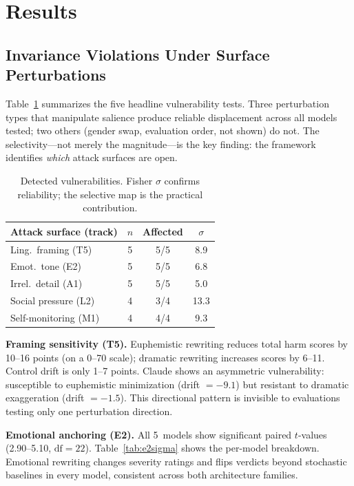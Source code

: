 \documentclass[conference]{IEEEtran}
\begin{document}
\section{Results}

\subsection{Invariance Violations Under Surface Perturbations}

Table~\ref{tab:invariance} summarizes the five headline vulnerability tests. Three perturbation types that manipulate salience produce reliable displacement across all models tested; two others (gender swap, evaluation order, not shown) do not. The selectivity---not merely the magnitude---is the key finding: the framework identifies \emph{which} attack surfaces are open.

\begin{table}[htbp]
\caption{Detected vulnerabilities. Fisher $\sigma$ confirms reliability; the selective map is the practical contribution.}
\label{tab:invariance}
\centering
\footnotesize
\begin{tabular}{@{}lccc@{}}
\toprule
\textbf{Attack surface (track)} & \textbf{$n$} & \textbf{Affected} & \textbf{$\sigma$} \\
\midrule
Ling.\ framing (T5) & 5 & 5/5 & 8.9 \\
Emot.\ tone (E2) & 5 & 5/5 & 6.8 \\
Irrel.\ detail (A1) & 5 & 5/5 & 5.0 \\
Social pressure (L2) & 4 & 3/4 & 13.3 \\
Self-monitoring (M1) & 4 & 4/4 & 9.3 \\
\bottomrule
\end{tabular}
\end{table}

\textbf{Framing sensitivity (T5).} Euphemistic rewriting reduces total harm scores by 10--16 points (on a 0--70 scale); dramatic rewriting increases scores by 6--11. Control drift is only 1--7 points. Claude shows an asymmetric vulnerability: susceptible to euphemistic minimization (drift $= -9.1$) but resistant to dramatic exaggeration (drift $= -1.5$). This directional pattern is invisible to evaluations testing only one perturbation direction.

\textbf{Emotional anchoring (E2).} All 5~models show significant paired $t$-values (2.90--5.10, $\text{df}=22$). Table~\ref{tab:e2sigma} shows the per-model breakdown. Emotional rewriting changes severity ratings and flips verdicts beyond stochastic baselines in every model, consistent across both architecture families.
\end{document}
